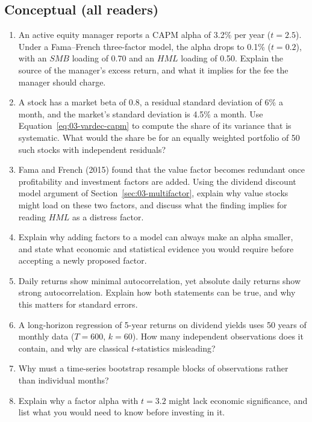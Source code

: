 \subsection*{Conceptual (all readers)}
\begin{enumerate}
  \item An active equity manager reports a CAPM alpha of 3.2\% per year ($t = 2.5$). Under a Fama--French three-factor model, the alpha drops to 0.1\% ($t = 0.2$), with an $SMB$ loading of 0.70 and an $HML$ loading of 0.50. Explain the source of the manager's excess return, and what it implies for the fee the manager should charge.
  \item A stock has a market beta of 0.8, a residual standard deviation of 6\% a month, and the market's standard deviation is 4.5\% a month. Use Equation~\eqref{eq:03-vardec-capm} to compute the share of its variance that is systematic. What would the share be for an equally weighted portfolio of 50 such stocks with independent residuals?
  \item Fama and French (2015) found that the value factor becomes redundant once profitability and investment factors are added. Using the dividend discount model argument of Section~\ref{sec:03-multifactor}, explain why value stocks might load on these two factors, and discuss what the finding implies for reading $HML$ as a distress factor.
  \item Explain why adding factors to a model can always make an alpha smaller, and state what economic and statistical evidence you would require before accepting a newly proposed factor.
  \item Daily returns show minimal autocorrelation, yet absolute daily returns show strong autocorrelation. Explain how both statements can be true, and why this matters for standard errors.
  \item A long-horizon regression of 5-year returns on dividend yields uses 50 years of monthly data ($T=600$, $k=60$). How many independent observations does it contain, and why are classical $t$-statistics misleading?
  \item Why must a time-series bootstrap resample blocks of observations rather than individual months?
  \item Explain why a factor alpha with $t = 3.2$ might lack economic significance, and list what you would need to know before investing in it.
\end{enumerate}

